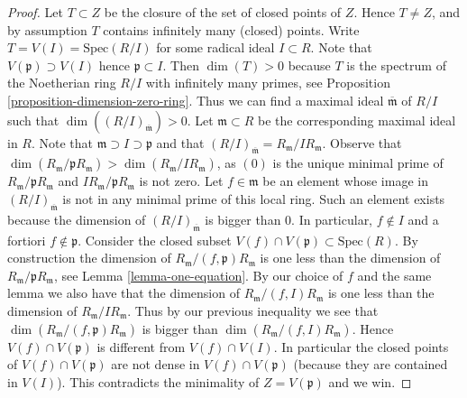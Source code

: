 \begin{proof}
\medskip\noindent
Let $T \subset Z$ be the closure of the set of closed
points of $Z$. Hence $T \not = Z$, and by assumption
$T$ contains infinitely many (closed) points.
Write $T = V(I) = \text{Spec}(R/I)$ for some radical
ideal $I \subset R$. Note that
$V(\mathfrak p) \supset V(I)$ hence $\mathfrak p \subset I$.
Then $\dim(T) > 0$ because $T$ is the spectrum
of the Noetherian ring $R/I$ with infinitely many primes,
see Proposition \ref{proposition-dimension-zero-ring}.
Thus we can find a maximal ideal $\overline{\mathfrak m}$
of $R/I$ such that $\dim((R/I)_{\overline{\mathfrak m}}) > 0$.
Let $\mathfrak m \subset R$ be the corresponding maximal
ideal in $R$. Note that $\mathfrak m \supset I \supset \mathfrak p$
and that $(R/I)_{\overline{\mathfrak m}} = R_{\mathfrak m}/IR_{\mathfrak m}$.
Observe that $\dim(R_{\mathfrak m}/\mathfrak pR_{\mathfrak m}) >
\dim(R_{\mathfrak m}/IR_{\mathfrak m})$, as $(0)$ is the
unique minimal prime of $R_{\mathfrak m}/\mathfrak pR_{\mathfrak m}$
and $IR_{\mathfrak m}/\mathfrak pR_{\mathfrak m}$ is not zero.
Let $f \in \mathfrak m$ be an element
whose image in $(R/I)_{\overline{\mathfrak m}}$ is not
in any minimal prime of this local ring. Such an element
exists because the dimension of $(R/I)_{\overline{\mathfrak m}}$
is bigger than $0$. In particular,
$f \not \in I$ and a fortiori $f \not \in \mathfrak p$.
Consider the closed subset $V(f) \cap V(\mathfrak p)
\subset \text{Spec}(R)$. By construction
the dimension of $R_{\mathfrak m}/(f, \mathfrak p)R_{\mathfrak m}$
is one less than the dimension of
$R_{\mathfrak m}/\mathfrak pR_{\mathfrak m}$,
see Lemma \ref{lemma-one-equation}. By our
choice of $f$
and the same lemma
we also have that the dimension
of $R_{\mathfrak m}/(f, I)R_{\mathfrak m}$
is one less than the dimension of $R_{\mathfrak m}/IR_{\mathfrak m}$.
Thus by our previous inequality we see
that $\dim(R_{\mathfrak m}/(f, \mathfrak p)R_{\mathfrak m})$
is bigger than $\dim(R_{\mathfrak m}/(f, I)R_{\mathfrak m})$.
Hence $V(f) \cap V(\mathfrak p)$ is
different from $V(f) \cap V(I)$. In particular the
closed points of $V(f) \cap V(\mathfrak p)$ are
not dense in $V(f) \cap V(\mathfrak p)$ (because they
are contained in $V(I)$). This contradicts the minimality
of $Z = V(\mathfrak p)$ and we win.
\end{proof}





















